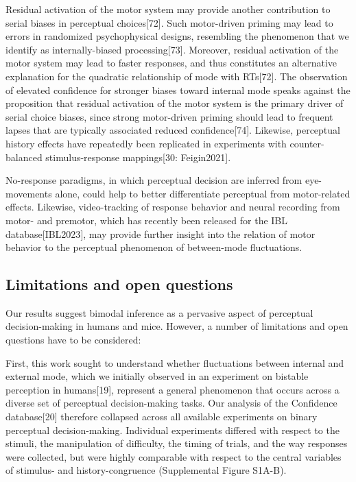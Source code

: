 \documentclass[
]{article}
\begin{document}
Residual activation of the motor system may provide another contribution
to serial biases in perceptual choices{[}72{]}. Such motor-driven
priming may lead to errors in randomized psychophysical designs,
resembling the phenomenon that we identify as internally-biased
processing{[}73{]}. Moreover, residual activation of the motor system
may lead to faster responses, and thus constitutes an alternative
explanation for the quadratic relationship of mode with RTs{[}72{]}. The
observation of elevated confidence for stronger biases toward internal
mode speaks against the proposition that residual activation of the
motor system is the primary driver of serial choice biases, since strong
motor-driven priming should lead to frequent lapses that are typically
associated reduced confidence{[}74{]}. Likewise, perceptual history
effects have repeatedly been replicated in experiments with
counter-balanced stimulus-response mappings{[}30: Feigin2021{]}.

No-response paradigms, in which perceptual decision are inferred from
eye-movements alone, could help to better differentiate perceptual from
motor-related effects. Likewise, video-tracking of response behavior and
neural recording from motor- and premotor, which has recently been
released for the IBL database{[}IBL2023{]}, may provide further insight
into the relation of motor behavior to the perceptual phenomenon of
between-mode fluctuations.

\hypertarget{limitations-and-open-questions}{%
\subsection{Limitations and open
questions}\label{limitations-and-open-questions}}

Our results suggest bimodal inference as a pervasive aspect of
perceptual decision-making in humans and mice. However, a number of
limitations and open questions have to be considered:

First, this work sought to understand whether fluctuations between
internal and external mode, which we initially observed in an experiment
on bistable perception in humans{[}19{]}, represent a general phenomenon
that occurs across a diverse set of perceptual decision-making tasks.
Our analysis of the Confidence database{[}20{]} therefore collapsed
across all available experiments on binary perceptual decision-making.
Individual experiments differed with respect to the stimuli, the
manipulation of difficulty, the timing of trials, and the way responses
were collected, but were highly comparable with respect to the central
variables of stimulus- and history-congruence (Supplemental Figure
S1A-B).
\end{document}
